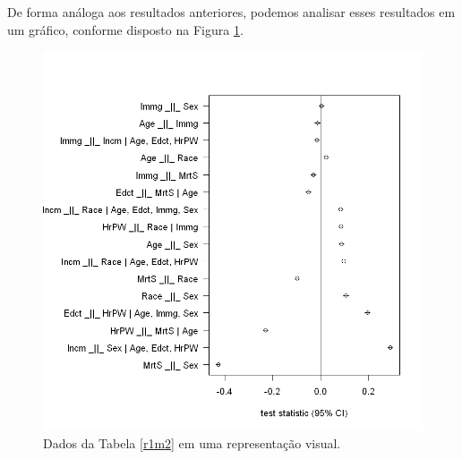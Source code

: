 \documentclass[11pt,letterpaper,twocolumn]{article}
\begin{document}
De forma análoga aos resultados anteriores, podemos analisar esses resultados em um gráfico, conforme disposto na Figura \ref{r1m2f}.
\begin{figure}
    \centering
    \includegraphics[scale = 0.5]{A2/Imagens/r1m2.png}
    \caption{Dados da Tabela \ref{r1m2} em uma representação visual.}
    \label{r1m2f}
\end{figure}
\end{document}
